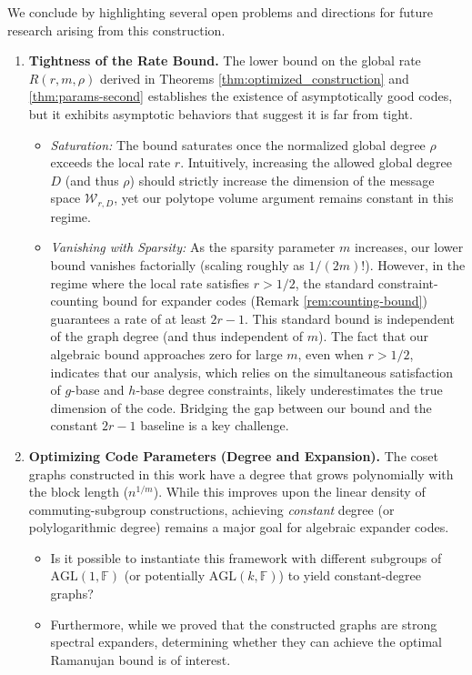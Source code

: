 \documentclass[11pt]{article}
\theoremstyle{plain}
\theoremstyle{definition}
\begin{document}
We conclude by highlighting several open problems and directions for future research arising from this construction.

\begin{enumerate}
    \item \textbf{Tightness of the Rate Bound.}
    The lower bound on the global rate $R(r, m, \rho)$ derived in Theorems \ref{thm:optimized_construction}  and \ref{thm:params-second} establishes the existence of asymptotically good codes, but it exhibits asymptotic behaviors that suggest it is far from tight.
    \begin{itemize}
        \item \emph{Saturation:} The bound saturates once the normalized global degree $\rho$ exceeds the local rate $r$. Intuitively, increasing the allowed global degree $D$ (and thus $\rho$) should strictly increase the dimension of the message space $\mathcal{W}_{r,D}$, yet our polytope volume argument remains constant in this regime.
        \item \emph{Vanishing with Sparsity:} As the sparsity parameter $m$ increases, our lower bound vanishes factorially (scaling roughly as $1/(2m)!$). However, in the regime where the local rate satisfies $r > 1/2$, the standard constraint-counting bound for expander codes (Remark \ref{rem:counting-bound}) guarantees a rate of at least $2r-1$. This standard bound is independent of the graph degree (and thus independent of $m$). The fact that our algebraic bound approaches zero for large $m$, even when $r > 1/2$, indicates that our analysis, which relies on the simultaneous satisfaction of $g$-base and $h$-base degree constraints, likely underestimates the true dimension of the code. Bridging the gap between our bound and the constant $2r-1$ baseline is a key challenge.
    \end{itemize}

    \item \textbf{Optimizing Code Parameters (Degree and Expansion).}
    The coset graphs constructed in this work have a degree that grows polynomially with the block length ($n^{1/m}$). While this improves upon the linear density of commuting-subgroup constructions, achieving \emph{constant} degree (or polylogarithmic degree) remains a major goal for algebraic expander codes.
    \begin{itemize}
        \item Is it possible to instantiate this framework with different subgroups of $\mathrm{AGL}(1, \mathbb{F})$ (or potentially $\mathrm{AGL}(k, \mathbb{F})$) to yield constant-degree graphs?
        \item Furthermore, while we proved that the constructed graphs are strong spectral expanders, determining whether they can achieve the optimal Ramanujan bound is of  interest.
    \end{itemize}


\end{enumerate}
\end{document}
